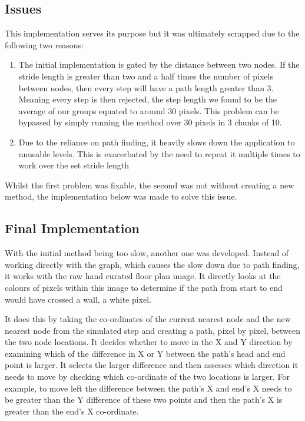\documentclass[12pt,a4paper]{report}
\begin{document}
\subsection{Issues}

This implementation serves its purpose but it was ultimately scrapped due to the following two reasons:

\begin{enumerate}
	\item The initial implementation is gated by the distance between two nodes. If the stride length is greater than two and a half times the number of pixels between nodes, then every step will have a path length greater than 3. Meaning every step is then rejected, the step length we found to be the average of our groups equated to around 30 pixels. This problem can be bypassed by simply running the method over 30 pixels in 3 chunks of 10.
	\item Due to the reliance on path finding, it heavily slows down the application to unusable levels. This is exacerbated by the need to repeat it multiple times to work over the set stride length
\end{enumerate}

Whilst the first problem was fixable, the second was not without creating a new method, the implementation below was made to solve this issue.

\subsection{Final Implementation}

With the initial method being too slow, another one was developed. Instead of working directly with the graph, which causes the slow down due to path finding, it works with the raw hand curated floor plan image. It directly looks at the colours of pixels within this image to determine if the path from start to end would have crossed a wall, a white pixel.

It does this by taking the co-ordinates of the current nearest node and the new nearest node from the simulated step and creating a path, pixel by pixel, between the two node locations. It decides whether to move in the X and Y direction by examining which of the difference in X or Y between the path's head and end point is larger. It selects the larger difference and then assesses which direction it needs to move by checking which co-ordinate of the two locations is larger. For example, to move left the difference between the path's X and end's X needs to be greater than the Y difference of these two points and then the path's X is greater than the end's X co-ordinate.
\end{document}
